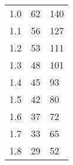 \begin{table}[H]
{\begin{tabular}{|l|l|l|}
1.0                      & 62                                                                                                                  & 140                                                                                                                \\
1.1                      & 56                                                                                                                  & 127                                                                                                                \\
1.2                      & 53                                                                                                                  & 111                                                                                                                \\
1.3                      & 48                                                                                                                  & 101                                                                                                                \\
1.4                      & 45                                                                                                                  & 93                                                                                                                 \\
1.5                      & 42                                                                                                                  & 80                                                                                                                 \\
1.6                      & 37                                                                                                                  & 72                                                                                                                 \\
1.7                      & 33                                                                                                                  & 65                                                                                                                 \\
1.8                      & 29                                                                                                                  & 52                                                                                                                 \\

\end{tabular}}
\end{table}
